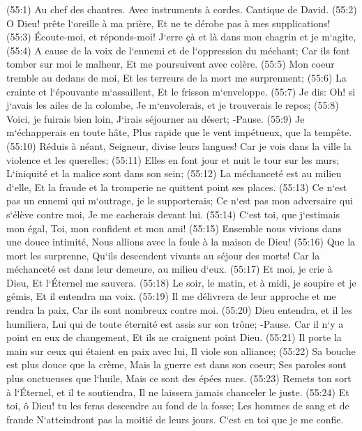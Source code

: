\verse (55:1) Au chef des chantres. Avec instruments à cordes. Cantique de David. (55:2) O Dieu! prête l`oreille à ma prière, Et ne te dérobe pas à mes supplications! 
\verse (55:3) Écoute-moi, et réponds-moi! J`erre çà et là dans mon chagrin et je m`agite, 
\verse (55:4) A cause de la voix de l`ennemi et de l`oppression du méchant; Car ils font tomber sur moi le malheur, Et me poursuivent avec colère. 
\verse (55:5) Mon coeur tremble au dedans de moi, Et les terreurs de la mort me surprennent; 
\verse (55:6) La crainte et l`épouvante m`assaillent, Et le frisson m`enveloppe. 
\verse (55:7) Je dis: Oh! si j`avais les ailes de la colombe, Je m`envolerais, et je trouverais le repos; 
\verse (55:8) Voici, je fuirais bien loin, J`irais séjourner au désert; -Pause. 
\verse (55:9) Je m`échapperais en toute hâte, Plus rapide que le vent impétueux, que la tempête. 
\verse (55:10) Réduis à néant, Seigneur, divise leurs langues! Car je vois dans la ville la violence et les querelles; 
\verse (55:11) Elles en font jour et nuit le tour sur les murs; L`iniquité et la malice sont dans son sein; 
\verse (55:12) La méchanceté est au milieu d`elle, Et la fraude et la tromperie ne quittent point ses places. 
\verse (55:13) Ce n`est pas un ennemi qui m`outrage, je le supporterais; Ce n`est pas mon adversaire qui s`élève contre moi, Je me cacherais devant lui. 
\verse (55:14) C`est toi, que j`estimais mon égal, Toi, mon confident et mon ami! 
\verse (55:15) Ensemble nous vivions dans une douce intimité, Nous allions avec la foule à la maison de Dieu! 
\verse (55:16) Que la mort les surprenne, Qu`ils descendent vivants au séjour des morts! Car la méchanceté est dans leur demeure, au milieu d`eux. 
\verse (55:17) Et moi, je crie à Dieu, Et l`Éternel me sauvera. 
\verse (55:18) Le soir, le matin, et à midi, je soupire et je gémis, Et il entendra ma voix. 
\verse (55:19) Il me délivrera de leur approche et me rendra la paix, Car ils sont nombreux contre moi. 
\verse (55:20) Dieu entendra, et il les humiliera, Lui qui de toute éternité est assis sur son trône; -Pause. Car il n`y a point en eux de changement, Et ils ne craignent point Dieu. 
\verse (55:21) Il porte la main sur ceux qui étaient en paix avec lui, Il viole son alliance; 
\verse (55:22) Sa bouche est plus douce que la crème, Mais la guerre est dans son coeur; Ses paroles sont plus onctueuses que l`huile, Mais ce sont des épées nues. 
\verse (55:23) Remets ton sort à l`Éternel, et il te soutiendra, Il ne laissera jamais chanceler le juste. 
\verse (55:24) Et toi, ô Dieu! tu les feras descendre au fond de la fosse; Les hommes de sang et de fraude N`atteindront pas la moitié de leurs jours. C`est en toi que je me confie. 

